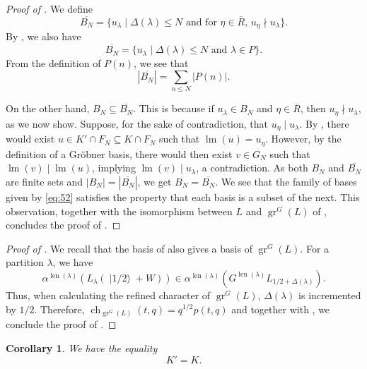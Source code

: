 \documentclass[a4paper, 12pt, reqno]{amsart}
\newtheorem{corollary}[theorem]{Corollary}
\theoremstyle{remark}
\DeclareMathOperator{\gr}{gr}
\DeclareMathOperator{\ch}{ch}
\DeclareMathOperator{\lm}{lm}
\DeclareMathOperator{\len}{len}
\DeclareMathOperator{\vachalf}{|1/2\rangle}
\begin{document}
\begin{proof}[Proof of ]
  We define
  \begin{equation*}
    \overline{B_N} = \{u_{\lambda} \mid \text{$\Delta(\lambda) \le N$ and for $\eta \in \overline{R}$, $u_{\eta} \nmid u_{\lambda}$}\}.
  \end{equation*}
  By , we also have
  \begin{equation*}
    \overline{B_N} = \{u_{\lambda} \mid \text{$\Delta(\lambda) \le N$ and $\lambda \in P$}\}.
  \end{equation*}
  From the definition of $P(n)$, we see that
  \begin{equation*}
    |\overline{B_N}| = \sum_{n \le N}|P(n)|.
  \end{equation*}

  On the other hand, $B_N \subseteq \overline{B_N}$.
  This is because if $u_{\lambda} \in B_N$ and $\eta \in \overline{R}$, then $u_{\eta} \nmid u_{\lambda}$, as we now show.
  Suppose, for the sake of contradiction, that $u_{\eta} \mid u_{\lambda}$.
  By , there would exist $u \in K' \cap F_N \subseteq K \cap F_N$ such that $\lm(u) = u_{\eta}$.
  However, by the definition of a Gröbner basis, there would then exist $v \in G_N$ such that $\lm(v) \mid \lm(u)$, implying $\lm(v) \mid u_{\lambda}$, a contradiction.
  As both $B_N$ and $\overline{B_N}$ are finite sets and $|B_N| = |\overline{B_N}|$, we get $B_N = \overline{B_N}$.
  We see that the family of bases given by \eqref{eq:52} satisfies the property that each basis is a subset of the next.
  This observation, together with the isomorphism between $L$ and $\gr^G(L)$ of , concludes the proof of .
\end{proof}

\begin{proof}[Proof of ]
  We recall that the basis of  also gives a basis of $\gr^G(L)$.
  For a partition $\lambda$, we have
  \begin{equation*}
    \alpha^{\len(\lambda)}(L_{\lambda}(\vachalf + W)) \in \alpha^{\len(\lambda)}(G^{\len(\lambda)}L_{1/2 + \Delta(\lambda)}).
  \end{equation*}
  Thus, when calculating the refined character of $\gr^G(L)$, $\Delta(\lambda)$ is incremented by $1/2$.
  Therefore, $\ch_{\gr^G(L)}(t, q) = q^{1/2}p(t, q)$ and together with , we conclude the proof of .
\end{proof}

\begin{corollary}
  \label{crl:3}
  We have the equality
  \begin{equation*}
    K' = K.
  \end{equation*}
\end{corollary}
\end{document}

